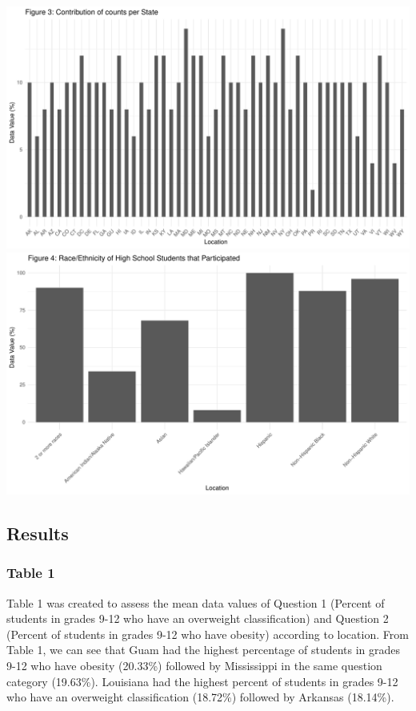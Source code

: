 \documentclass[
]{article}
\begin{document}
\includegraphics{FinalPM566---Rmarkdown_files/figure-latex/unnamed-chunk-20-1.pdf}
\includegraphics{FinalPM566---Rmarkdown_files/figure-latex/unnamed-chunk-21-1.pdf}

\subsection{Results}\label{results}

\subsubsection{Table 1}\label{table-1}

Table 1 was created to assess the mean data values of Question 1
(Percent of students in grades 9-12 who have an overweight
classification) and Question 2 (Percent of students in grades 9-12 who
have obesity) according to location. From Table 1, we can see that Guam
had the highest percentage of students in grades 9-12 who have obesity
(20.33\%) followed by Mississippi in the same question category
(19.63\%). Louisiana had the highest percent of students in grades 9-12
who have an overweight classification (18.72\%) followed by Arkansas
(18.14\%).
\end{document}
